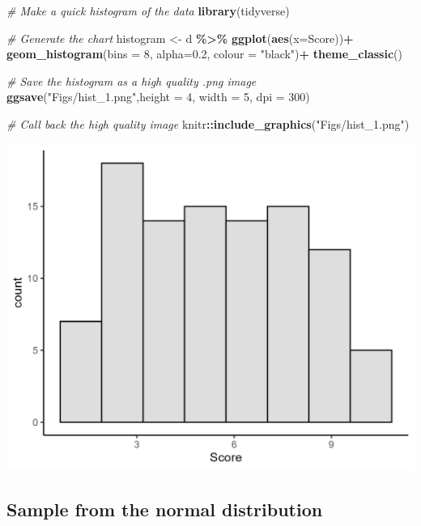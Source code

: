 \documentclass[
]{book}
\newenvironment{Shaded}{\begin{snugshade}}{\end{snugshade}}
\newcommand{\AttributeTok}[1]{\textcolor[rgb]{0.13,0.29,0.53}{#1}}
\newcommand{\CommentTok}[1]{\textcolor[rgb]{0.56,0.35,0.01}{\textit{#1}}}
\newcommand{\DecValTok}[1]{\textcolor[rgb]{0.00,0.00,0.81}{#1}}
\newcommand{\FloatTok}[1]{\textcolor[rgb]{0.00,0.00,0.81}{#1}}
\newcommand{\FunctionTok}[1]{\textcolor[rgb]{0.13,0.29,0.53}{\textbf{#1}}}
\newcommand{\NormalTok}[1]{#1}
\newcommand{\OtherTok}[1]{\textcolor[rgb]{0.56,0.35,0.01}{#1}}
\newcommand{\SpecialCharTok}[1]{\textcolor[rgb]{0.81,0.36,0.00}{\textbf{#1}}}
\newcommand{\StringTok}[1]{\textcolor[rgb]{0.31,0.60,0.02}{#1}}
\begin{document}
\begin{Shaded}
\begin{Highlighting}[]
\CommentTok{\# Make a quick histogram of the data}
\FunctionTok{library}\NormalTok{(tidyverse)}

\CommentTok{\# Generate the chart}
\NormalTok{histogram }\OtherTok{\textless{}{-}}\NormalTok{ d }\SpecialCharTok{\%\textgreater{}\%}
  \FunctionTok{ggplot}\NormalTok{(}\FunctionTok{aes}\NormalTok{(}\AttributeTok{x=}\NormalTok{Score))}\SpecialCharTok{+}
  \FunctionTok{geom\_histogram}\NormalTok{(}\AttributeTok{bins =} \DecValTok{8}\NormalTok{, }\AttributeTok{alpha=}\FloatTok{0.2}\NormalTok{, }\AttributeTok{colour =} \StringTok{"black"}\NormalTok{)}\SpecialCharTok{+}
  \FunctionTok{theme\_classic}\NormalTok{()}

\CommentTok{\# Save the histogram as a high quality .png image}
\FunctionTok{ggsave}\NormalTok{(}\StringTok{"Figs/hist\_1.png"}\NormalTok{,}\AttributeTok{height =} \DecValTok{4}\NormalTok{, }\AttributeTok{width =} \DecValTok{5}\NormalTok{, }\AttributeTok{dpi =} \DecValTok{300}\NormalTok{)}

\CommentTok{\# Call back the high quality image }
\NormalTok{knitr}\SpecialCharTok{::}\FunctionTok{include\_graphics}\NormalTok{(}\StringTok{"Figs/hist\_1.png"}\NormalTok{)}
\end{Highlighting}
\end{Shaded}

\includegraphics[width=20.83in]{Figs/hist_1}

\subsection*{Sample from the normal distribution}\label{sample-from-the-normal-distribution}
\end{document}
